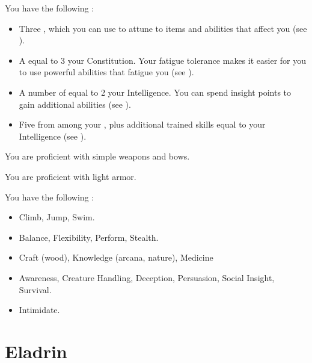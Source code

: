          You have the following :
        \begin{itemize}
            \item Three , which you can use to attune to items and abilities that affect you (see ).
            \item A  equal to 3 \add your Constitution.
                Your fatigue tolerance makes it easier for you to use powerful abilities that fatigue you (see ).
            \item A number of  equal to 2 \add your Intelligence.
                You can spend insight points to gain additional abilities (see ).
            \item Five  from among your , plus additional trained skills equal to your Intelligence (see ).
        \end{itemize}

        You are proficient with simple weapons and bows.

        You are proficient with light armor.

        You have the following :
        \begin{itemize}
            \item {} Climb, Jump, Swim.
            \item {} Balance, Flexibility, Perform, Stealth.
            \item {} Craft (wood), Knowledge (arcana, nature), Medicine
            \item {} Awareness, Creature Handling, Deception, Persuasion, Social Insight, Survival.
            \item {} Intimidate.
        \end{itemize}

\section{Eladrin}


